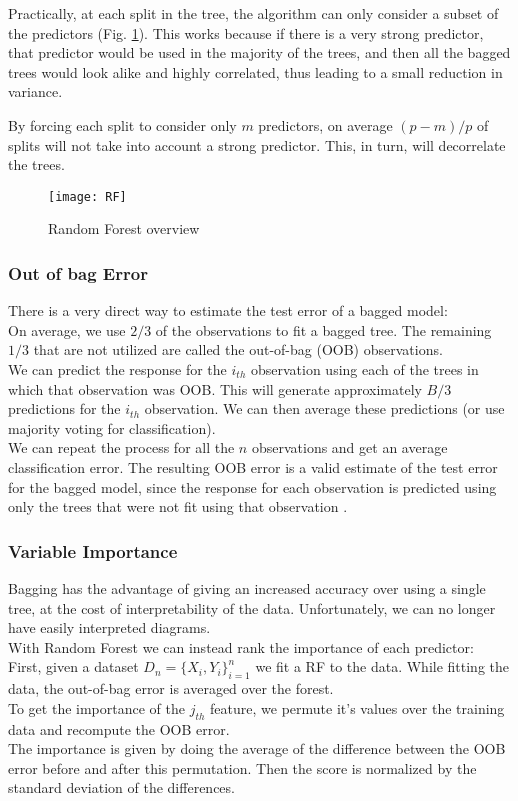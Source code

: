 Practically, at each split in the tree, the algorithm can only consider a subset of the predictors (Fig. \ref{fig:RF}). This works because if there is a very strong predictor, that predictor would be used in the majority of the trees, and then all the bagged trees would look alike and highly correlated, thus leading to a small reduction in variance.

By forcing each split to consider only $m$ predictors, on average $(p - m)/p$ of splits will not take into account a strong predictor. This, in turn, will decorrelate the trees.

\begin{figure}[H]
	\centering
	\texttt{[image: RF]}
	\caption{Random Forest overview}
	\label{fig:RF}
\end{figure}

\subsubsection{Out of bag Error}
There is a very direct way to estimate the test error of a bagged model: \\
On average, we use $2/3$ of the observations to fit a bagged tree. The remaining $1/3$ that are not utilized are called the out-of-bag (OOB) observations. \\
We can predict the response for the $i_{th}$ observation using each of the trees in which that observation was OOB. This will generate approximately $B/3$ predictions for the $i_{th}$ observation. We can then average these predictions (or use majority voting for classification). \\
We can repeat the process for all the $n$ observations and get an average classification error. The resulting OOB error is a valid estimate of the test error for the bagged model, since the response for each observation is predicted using only the trees that were not fit using that observation \cite{ISLR}. 

\subsubsection{Variable Importance}
Bagging has the advantage of giving an increased accuracy over using a single tree, at the cost of interpretability of the data. Unfortunately, we can no longer have easily interpreted diagrams.\\
With Random Forest we can instead rank the importance of each predictor: \\
First, given a dataset $D_n = \{X_i, Y_i\}_{i=1}^n$ we fit a RF to the data. While fitting the data, the out-of-bag error is averaged over the forest. \\
To get the importance of the $j_{th}$ feature, we permute it's values over the training data and recompute the OOB error. \\
The importance is given by doing the average of the difference between the OOB error before and after this permutation. Then the score is normalized by the standard deviation of the differences.


